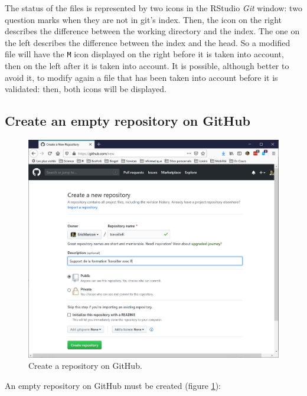 \documentclass[
  12pt,
  american,
  a4paper,
  extrafontsizes,onecolumn,openright
  ]{memoir}
\begin{document}
\normalsize

The status of the files is represented by two icons in the RStudio \emph{Git} window: two question marks when they are not in git's index.
Then, the icon on the right describes the difference between the working directory and the index.
The one on the left describes the difference between the index and the head.
So a modified file will have the \texttt{M} icon displayed on the right before it is taken into account, then on the left after it is taken into account.
It is possible, although better to avoid it, to modify again a file that has been taken into account before it is validated: then, both icons will be displayed.

\subsection{Create an empty repository on GitHub}\label{create-an-empty-repository-on-github}



\scriptsize

\begin{figure}

{\centering \includegraphics[width=0.8\linewidth]{images/CreateRepo} 

}

\caption{Create a repository on GitHub.}\label{fig:CreateRepo}
\end{figure}

\normalsize

An empty repository on GitHub must be created (figure \ref{fig:CreateRepo}):
\end{document}
